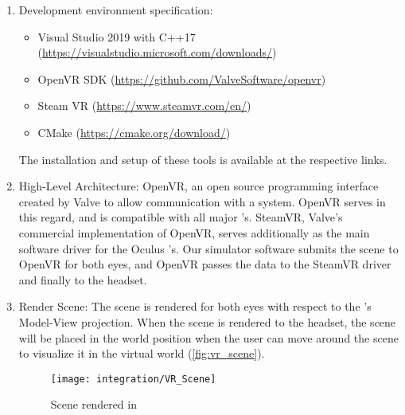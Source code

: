 \begin{enumerate}
  \item Development environment specification:
  \begin{itemize}
    \item Visual Studio 2019 with C++17 (\url{https://visualstudio.microsoft.com/downloads/})
    \item OpenVR SDK (\url{https://github.com/ValveSoftware/openvr})
    \item Steam VR (\url{https://www.steamvr.com/en/})
    \item CMake (\url{https://cmake.org/download/})
  \end{itemize}
  The installation and setup of these tools is available at the respective links.

  \item High-Level Architecture:
  OpenVR, an open source programming interface created by Valve to allow communication with a  system.  OpenVR serves in this regard, and is compatible with all major 's. SteamVR, Valve's commercial implementation of OpenVR, serves additionally as the main software driver for the Oculus 's. Our simulator software submits the scene to OpenVR for both eyes, and OpenVR passes the data to the SteamVR driver and finally to the  headset.

  \begin{center}
  \end{center}

  \item Render Scene:
  The scene is rendered for both eyes with respect to the 's Model-View projection. When the scene is rendered to the  headset, the scene will be placed in the world position when the user can move around the scene to visualize it in the virtual world (\autoref{fig:vr_scene}).

  \begin{figure}
    \centering
    \texttt{[image: integration/VR\_Scene]}
    \caption{Scene rendered in }
    \label{fig:vr_scene}
  \end{figure}


\end{enumerate}
